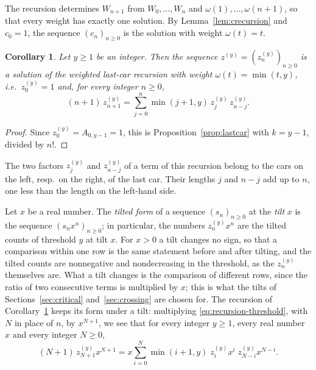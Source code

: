 \documentclass{amsart}
\newtheorem{corollary}[theorem]{Corollary}
\theoremstyle{definition}
\theoremstyle{remark}
\numberwithin{equation}{section}
\begin{document}
The recursion determines $W_{n+1}$ from $W_0,\dots,W_n$ and $\omega(1),\dots,\omega(n+1)$, so that every weight has exactly one solution. By Lemma~\ref{lem:crecursion} and $c_0=1$, the sequence $(c_n)_{n\ge 0}$ is the solution with weight $\omega(t)=t$.

\begin{corollary}\label{cor:normalised}
Let $y\ge 1$ be an integer. Then the sequence $z^{(y)}=(z^{(y)}_n)_{n\ge 0}$ is a solution of the weighted last-car recursion with weight $\omega(t)=\min(t,y)$, i.e.\ $z^{(y)}_0=1$ and, for every integer $n\ge 0$,
\begin{equation}\label{eq:recursion-threshold}
(n+1)\,z^{(y)}_{n+1}=\sum_{j=0}^{n}\min(j+1,y)\,z^{(y)}_j\,z^{(y)}_{n-j}.
\end{equation}
\end{corollary}

\begin{proof}
Since $z^{(y)}_0=A_{0,y-1}=1$, this is Proposition~\ref{prop:lastcar} with $k=y-1$, divided by $n!$.
\end{proof}

The two factors $z^{(y)}_j$ and $z^{(y)}_{n-j}$ of a term of this recursion belong to the cars on the left, resp.\ on the right, of the last car. Their lengths $j$ and $n-j$ add up to $n$, one less than the length on the left-hand side.

Let $x$ be a real number. The \emph{tilted form} of a sequence $(s_n)_{n\ge 0}$ at the \emph{tilt} $x$ is the sequence $(s_nx^n)_{n\ge 0}$; in particular, the numbers $z^{(y)}_nx^n$ are the tilted counts of threshold $y$ at tilt $x$. For $x>0$ a tilt changes no sign, so that a comparison within one row is the same statement before and after tilting, and the tilted counts are nonnegative and nondecreasing in the threshold, as the $z^{(y)}_n$ themselves are. What a tilt changes is the comparison of different rows, since the ratio of two consecutive terms is multiplied by $x$; this is what the tilts of Sections~\ref{sec:critical} and~\ref{sec:crossing} are chosen for. The recursion of Corollary~\ref{cor:normalised} keeps its form under a tilt: multiplying \eqref{eq:recursion-threshold}, with $N$ in place of $n$, by $x^{N+1}$, we see that for every integer $y\ge 1$, every real number $x$ and every integer $N\ge 0$,
\begin{equation}\label{eq:recursion-tilted}
(N+1)\,z^{(y)}_{N+1}x^{N+1}=x\sum_{i=0}^{N}\min(i+1,y)\;z^{(y)}_i x^{i}\;z^{(y)}_{N-i}x^{N-i}.
\end{equation}
\end{document}
